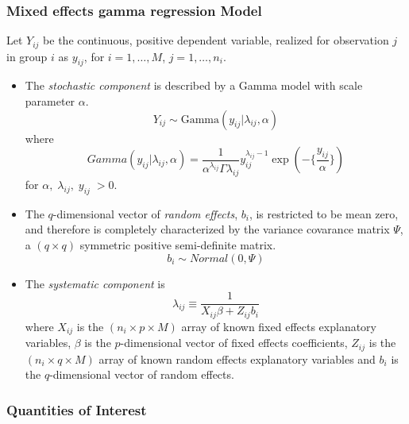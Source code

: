 \subsubsection{Mixed effects gamma regression Model}

Let $Y_{ij}$ be the continuous, positive dependent variable, realized for observation $j$ in group $i$ as $y_{ij}$, for $i = 1, \ldots, M$, $j = 1, \ldots, n_i$.

\begin{itemize}
\item The \emph{stochastic component} is described by a Gamma model with scale parameter $\alpha$.
\begin{equation*}
Y_{ij} \sim \mathrm{Gamma}(y_{ij} | \lambda_{ij}, \alpha)
\end{equation*}
where
\begin{equation*}
Gamma(y_{ij} | \lambda_{ij}, \alpha) = \frac{1}{\alpha^{\lambda_{ij}} \Gamma \lambda_{ij}} y_{ij}^{\lambda_{ij} - 1} \exp (- \{ \frac{y_{ij}}{\alpha} \})
\end{equation*}
for $\alpha, \; \lambda_{ij}, \; y_{ij} \; > 0$.
\item The $q$-dimensional vector of \emph{random effects}, $b_i$, is restricted to be mean zero, and therefore is completely characterized by the variance covarance matrix $\Psi$, a $(q \times q)$ symmetric positive semi-definite matrix.
\begin{equation*}
b_i \sim Normal(0, \Psi)
\end{equation*}
\item The \emph{systematic component} is
\begin{equation*}
\lambda_{ij} \equiv \frac{1}{X_{ij} \beta + Z_{ij} b_i}
\end{equation*}
where $X_{ij}$ is the $(n_i \times p \times M)$ array of known fixed effects explanatory variables, $\beta$ is the $p$-dimensional vector of fixed effects coefficients, $Z_{ij}$ is the $(n_i \times q \times M)$ array of known random effects explanatory variables and $b_i$ is the $q$-dimensional vector of random effects.
\end{itemize}

\subsubsection{Quantities of Interest}

